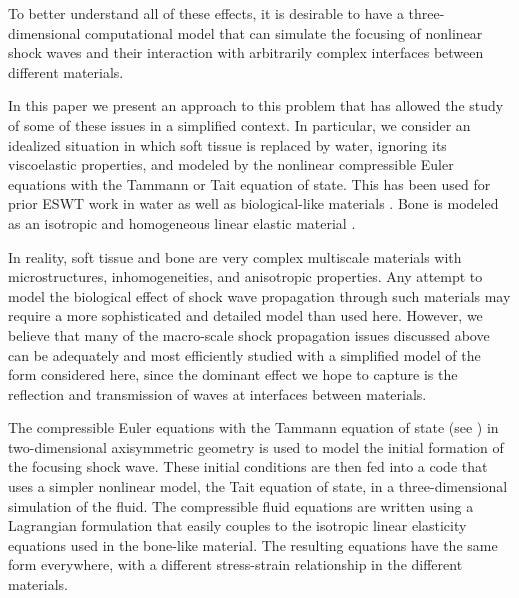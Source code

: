 \documentclass{article}
\begin{document}
 

To better understand all of these effects, it is desirable to have a
three-dimensional computational model that can simulate the focusing of
nonlinear shock waves and their interaction with arbitrarily complex
interfaces between different materials.  


In this paper we present an approach to this problem that has allowed
the study of some of these issues in a simplified context.  In
particular, we consider an idealized situation in which soft tissue
is replaced by water, ignoring its viscoelastic properties, and
modeled by the nonlinear compressible Euler equations with the
Tammann or Tait equation of state.  This has been used for prior ESWT 
work in water as well as biological-like materials \cite{ivings_toro, nakahara}.
Bone is modeled as an isotropic
and homogeneous linear elastic material \cite{fung,keaveny}.  

In reality, soft tissue and bone are very complex multiscale materials
with microstructures, inhomogeneities, and anisotropic properties.
Any attempt to model the biological effect of shock wave propagation
through such materials may require a more sophisticated and detailed
model than used here.  However, we believe that many of the macro-scale
shock propagation issues discussed above can be adequately and most
efficiently studied with a simplified model of the form considered here,
since the dominant effect we hope to capture is the reflection and
transmission of waves at interfaces between materials.  

The compressible Euler equations with the Tammann equation of state (see
) in two-dimensional axisymmetric geometry is used to model the
initial formation of the focusing shock wave.  These initial conditions are
then fed into a code that uses a simpler nonlinear
model, the Tait equation of state,
in a three-dimensional simulation of the fluid.  The compressible fluid
equations are written using a Lagrangian formulation that easily couples to
the isotropic linear elasticity equations used in the bone-like material.
The resulting equations have the same form everywhere, with a different
stress-strain relationship in the different materials.
\end{document}
